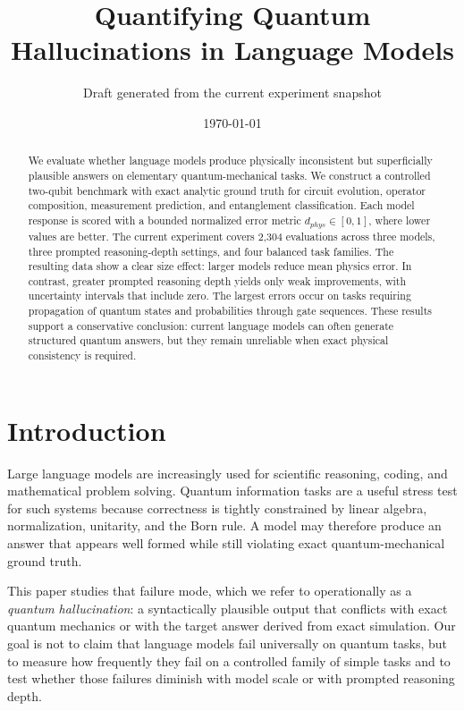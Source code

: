 \documentclass[11pt]{article}
\title{Quantifying Quantum Hallucinations in Language Models}
\author{Draft generated from the current experiment snapshot}
\date{\today}
\begin{document}
\maketitle
\onehalfspacing

\begin{abstract}
We evaluate whether language models produce physically inconsistent but superficially plausible answers on elementary quantum-mechanical tasks. We construct a controlled two-qubit benchmark with exact analytic ground truth for circuit evolution, operator composition, measurement prediction, and entanglement classification. Each model response is scored with a bounded normalized error metric $d_{phys} \in [0,1]$, where lower values are better. The current experiment covers 2{,}304 evaluations across three models, three prompted reasoning-depth settings, and four balanced task families. The resulting data show a clear size effect: larger models reduce mean physics error. In contrast, greater prompted reasoning depth yields only weak improvements, with uncertainty intervals that include zero. The largest errors occur on tasks requiring propagation of quantum states and probabilities through gate sequences. These results support a conservative conclusion: current language models can often generate structured quantum answers, but they remain unreliable when exact physical consistency is required.
\end{abstract}

\section{Introduction}
Large language models are increasingly used for scientific reasoning, coding, and mathematical problem solving. Quantum information tasks are a useful stress test for such systems because correctness is tightly constrained by linear algebra, normalization, unitarity, and the Born rule. A model may therefore produce an answer that appears well formed while still violating exact quantum-mechanical ground truth.

This paper studies that failure mode, which we refer to operationally as a \emph{quantum hallucination}: a syntactically plausible output that conflicts with exact quantum mechanics or with the target answer derived from exact simulation. Our goal is not to claim that language models fail universally on quantum tasks, but to measure how frequently they fail on a controlled family of simple tasks and to test whether those failures diminish with model scale or with prompted reasoning depth.
\end{document}
